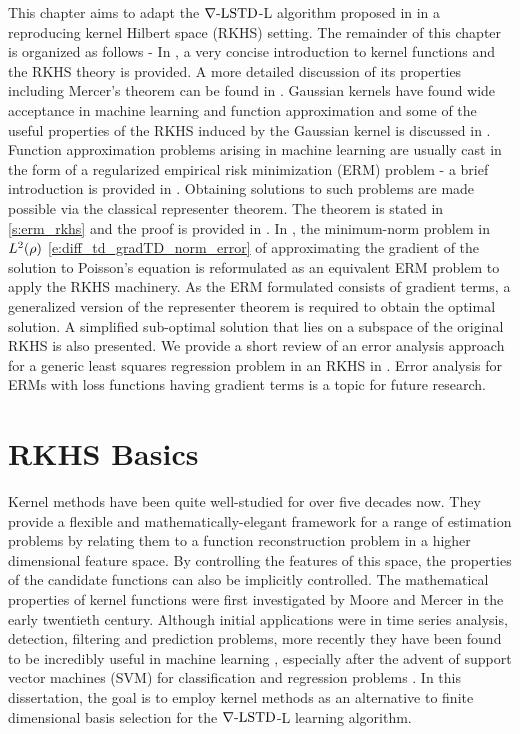 This chapter aims to adapt the $\nabla\text{-LSTD}$-L algorithm proposed in  in a reproducing kernel Hilbert space (RKHS) setting.  The remainder of this chapter is organized as follows - In , a very concise introduction to kernel functions and the RKHS theory is provided. A more detailed discussion of its properties including Mercer's theorem can be found in . Gaussian kernels have found wide acceptance in machine learning and function approximation and some of the useful properties of the RKHS induced by the Gaussian kernel is discussed in . Function approximation problems arising in machine learning are usually cast in the form of a regularized empirical risk minimization (ERM) problem - a brief introduction is provided in . Obtaining solutions to such problems are made possible via the classical representer theorem. The theorem is stated in \ref{s:erm_rkhs} and the proof is provided in . In , the minimum-norm problem in $L^2(\rho)$ \eqref{e:diff_td_gradTD_norm_error} of approximating the gradient of the solution to Poisson's equation is reformulated as an equivalent ERM problem to apply the RKHS machinery. As the ERM formulated consists of gradient terms, a generalized  version of the representer theorem is required to obtain the optimal solution.  A simplified sub-optimal solution that lies on a subspace of the original RKHS is also presented. We provide a short review of an error analysis approach for a generic least squares regression problem in an RKHS in . Error analysis for ERMs with loss functions having gradient terms is a topic for future research.%

\section{RKHS Basics}
\label{s:rkhs_basics}
Kernel methods have been quite well-studied for over five decades now. They provide a flexible and mathematically-elegant framework for a range of estimation problems by relating them to a function reconstruction problem in a higher dimensional feature space. By controlling the features of this space, the properties of the candidate functions can also be implicitly controlled. The mathematical properties of kernel functions were first investigated by Moore \cite{moo1916} and Mercer \cite{merrus09} in the early twentieth century. Although initial applications were in time series analysis, detection, filtering and prediction problems, more recently they have been found to be incredibly useful in machine learning \cite{wah90}, especially after the advent of support vector machines (SVM) for classification and regression problems \cite{corvap95, drucburkaufsmovap97}. In this dissertation, the goal is to employ kernel methods as an alternative to finite dimensional basis selection for the $\nabla\text{-LSTD}$-L learning algorithm. 
